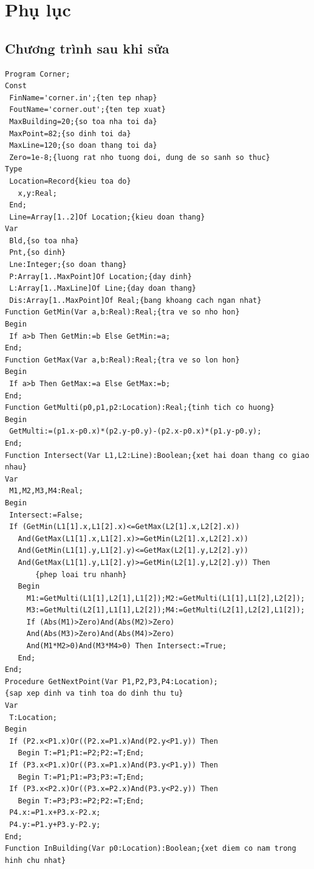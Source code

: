 \documentclass[11pt]{article}
\begin{document}
\section*{Phụ lục}

\subsection*{Chương trình sau khi sửa}

\begingroup\small
\begin{verbatim}
Program Corner;
Const
 FinName='corner.in';{ten tep nhap}
 FoutName='corner.out';{ten tep xuat}
 MaxBuilding=20;{so toa nha toi da}
 MaxPoint=82;{so dinh toi da}
 MaxLine=120;{so doan thang toi da}
 Zero=1e-8;{luong rat nho tuong doi, dung de so sanh so thuc}
Type
 Location=Record{kieu toa do}
   x,y:Real;
 End;
 Line=Array[1..2]Of Location;{kieu doan thang}
Var
 Bld,{so toa nha}
 Pnt,{so dinh}
 Lne:Integer;{so doan thang}
 P:Array[1..MaxPoint]Of Location;{day dinh}
 L:Array[1..MaxLine]Of Line;{day doan thang}
 Dis:Array[1..MaxPoint]Of Real;{bang khoang cach ngan nhat}
Function GetMin(Var a,b:Real):Real;{tra ve so nho hon}
Begin
 If a>b Then GetMin:=b Else GetMin:=a;
End;
Function GetMax(Var a,b:Real):Real;{tra ve so lon hon}
Begin
 If a>b Then GetMax:=a Else GetMax:=b;
End;
Function GetMulti(p0,p1,p2:Location):Real;{tinh tich co huong}
Begin
 GetMulti:=(p1.x-p0.x)*(p2.y-p0.y)-(p2.x-p0.x)*(p1.y-p0.y);
End;
Function Intersect(Var L1,L2:Line):Boolean;{xet hai doan thang co giao nhau}
Var
 M1,M2,M3,M4:Real;
Begin
 Intersect:=False;
 If (GetMin(L1[1].x,L1[2].x)<=GetMax(L2[1].x,L2[2].x))
   And(GetMax(L1[1].x,L1[2].x)>=GetMin(L2[1].x,L2[2].x))
   And(GetMin(L1[1].y,L1[2].y)<=GetMax(L2[1].y,L2[2].y))
   And(GetMax(L1[1].y,L1[2].y)>=GetMin(L2[1].y,L2[2].y)) Then
       {phep loai tru nhanh}
   Begin
     M1:=GetMulti(L1[1],L2[1],L1[2]);M2:=GetMulti(L1[1],L1[2],L2[2]);
     M3:=GetMulti(L2[1],L1[1],L2[2]);M4:=GetMulti(L2[1],L2[2],L1[2]);
     If (Abs(M1)>Zero)And(Abs(M2)>Zero)
     And(Abs(M3)>Zero)And(Abs(M4)>Zero)
     And(M1*M2>0)And(M3*M4>0) Then Intersect:=True;
   End;
End;
Procedure GetNextPoint(Var P1,P2,P3,P4:Location);
{sap xep dinh va tinh toa do dinh thu tu}
Var
 T:Location;
Begin
 If (P2.x<P1.x)Or((P2.x=P1.x)And(P2.y<P1.y)) Then
   Begin T:=P1;P1:=P2;P2:=T;End;
 If (P3.x<P1.x)Or((P3.x=P1.x)And(P3.y<P1.y)) Then
   Begin T:=P1;P1:=P3;P3:=T;End;
 If (P3.x<P2.x)Or((P3.x=P2.x)And(P3.y<P2.y)) Then
   Begin T:=P3;P3:=P2;P2:=T;End;
 P4.x:=P1.x+P3.x-P2.x;
 P4.y:=P1.y+P3.y-P2.y;
End;
Function InBuilding(Var p0:Location):Boolean;{xet diem co nam trong hinh chu nhat}

\end{verbatim}
\end{document}
